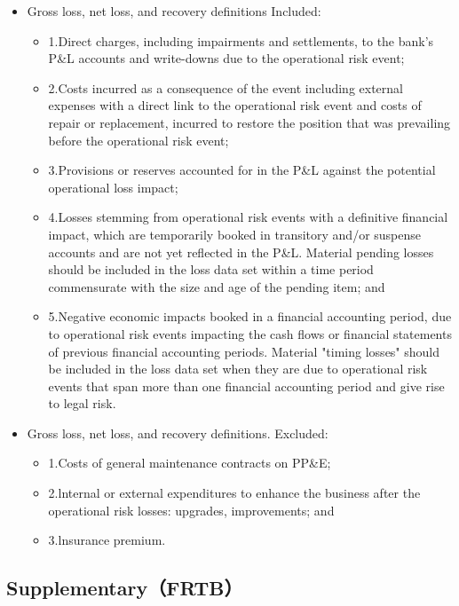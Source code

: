 \begin{itemize}
\item Gross loss, net loss, and recovery definitions Included:
    \begin{itemize}
    \item 1.Direct charges, including impairments and settlements, to the bank's P\&L accounts and write-downs due to the operational risk event;
    \item 2.Costs incurred as a consequence of the event including external expenses with a direct link to the operational risk event and costs of repair or replacement, incurred to restore the position that was prevailing before the operational risk event;
    \item 3.Provisions or reserves accounted for in the P\&L against the potential operational loss impact;
    \item 4.Losses stemming from operational risk events with a definitive financial impact, which are temporarily booked in transitory and/or suspense accounts and are not yet reflected in the P\&L. Material pending losses should be included in the loss data set within a time period commensurate with the size and age of the pending item; and
    \item 5.Negative economic impacts booked in a financial accounting period, due to operational risk events impacting the cash flows or financial statements of previous financial accounting periods. Material "timing losses" should be included in the loss data set when they are due to operational risk events that span more than one financial accounting period and give rise to legal risk.
    \end{itemize}
\item Gross loss, net loss, and recovery definitions. Excluded:
    \begin{itemize}
    \item 1.Costs of general maintenance contracts on PP\&E;
    \item 2.lnternal or external expenditures to enhance the business after the operational risk losses: upgrades, improvements; and
    \item 3.lnsurance premium.
    \end{itemize}
\end{itemize}




\subsection{Supplementary（FRTB）}



